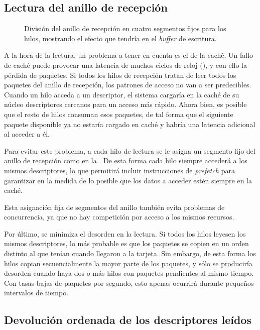 \documentclass[twoside, 12pt, draft]{epstfg}
\begin{document}
\subsection{Lectura del anillo de recepción}

\begin{figure}[hbtp]
\centering

\caption[División del anillo de recepción en cuatro segmentos fijos para los hilos]{División del anillo de recepción en cuatro segmentos fijos para los hilos, mostrando el efecto que tendría en el \textit{buffer} de escritura.}
\label{fig:Desarrollo:RingAssignment}
\end{figure}

A la hora de la lectura, un problema a tener en cuenta es el de la caché. Un fallo de caché puede provocar una latencia de muchos ciclos de reloj (), y con ello la pérdida de paquetes. Si todos los hilos de recepción tratan de leer todos los paquetes del anillo de recepción, los patrones de acceso no van a ser predecibles. Cuando un hilo acceda a un descriptor, el sistema cargaría en la caché de su núcleo descriptores cercanos para un acceso más rápido. Ahora bien, es posible que el resto de hilos consuman esos paquetes, de tal forma que el siguiente paquete disponible ya no estaría cargado en caché y habría una latencia adicional al acceder a él.

Para evitar este problema, a cada hilo de lectura se le asigna un segmento fijo del anillo de recepción como en la . De esta forma cada hilo siempre accederá a los mismos descriptores, lo que permitirá incluir instrucciones de \textit{prefetch} para garantizar en la medida de lo posible que los datos a acceder estén siempre en la caché.

Esta asignación fija de segmentos del anillo también evita problemas de concurrencia, ya que no hay competición por acceso a los mismos recursos.

Por último, se minimiza el desorden en la lectura. Si todos los hilos leyesen los mismos descriptores, lo más probable es que los paquetes se copien en un orden distinto al que tenían cuando llegaron a la tarjeta. Sin embargo, de esta forma los hilos copian secuencialmente la mayor parte de los paquetes, y sólo se produciría desorden cuando haya dos o más hilos con paquetes pendientes al mismo tiempo. Con tasas bajas de paquetes por segundo, esto apenas ocurrirá durante pequeños intervalos de tiempo.

\subsection{Devolución ordenada de los descriptores leídos}
\end{document}
